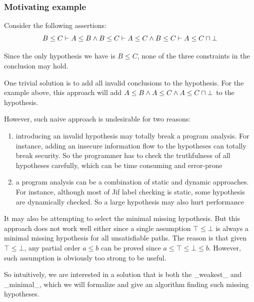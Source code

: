\subsubsection{Motivating example}

Consider the following assertions: 
%
\[B\leq C \vdash A\leq B \land B\leq C \vdash A\leq C \land B\leq C
\vdash A\leq C\sqcap \bot \]

Since the only hypothesis we have is $B\leq C$, none of the three
constraints in the conclusion may hold. 

One trivial solution is to add all invalid conclusions to the
hypothesis. For the example above, this approach will add $A\leq B
\land A\leq C \land A\leq C\sqcap \bot$ to the hypothesis.

However, such naive approach is undesirable for two reasons: 
%
\begin{enumerate}
\item introducing an invalid hypothesis may totally break a program
analysis. For instance, adding an insecure information flow to the
hypotheses can totally break security. So the programmer has to check
the truthfulness of all hypotheses carefully, which can be time
consuming and error-prone

\item a program analysis can be a combination of static and dynamic
approaches. For instance, although most of Jif label checking is
static, some hypothesis are dynamically checked. So a large hypothesis
may also hurt performance
\end{enumerate}

It may also be attempting to select the minimal missing hypothesis.
But this approach does not work well either since a single assumption
$\top\leq \bot$ is always a minimal missing hypothesis for all
unsatisfiable paths. The reason is that given $\top\leq \bot$, any
partial order $a \leq b$ can be proved since $a\leq \top\leq \bot\leq
b$. However, such assumption is obviously too strong to be useful.

So intuitively, we are interested in a solution that is both the
_weakest_ and _minimal_, which we will formalize and give an algorithm
finding such missing hypotheses. 

